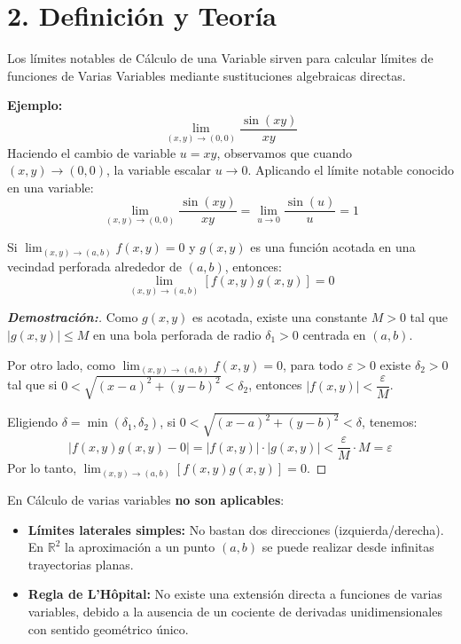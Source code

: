 \documentclass[11pt]{article}
\newenvironment{teoria}{%
  \section*{2. Definición y Teoría}%
}{}
\newenvironment{teorema}[1]{%
  \begin{tcolorbox}[colback=green!5,colframe=green!75!black,title=Teorema: #1]%
}{%
  \end{tcolorbox}%
}
\newenvironment{alerta}[1]{%
  \begin{tcolorbox}[colback=yellow!10,colframe=orange!80!black,title=Alerta: #1]%
}{%
  \end{tcolorbox}%
}
\newenvironment{procesamiento}[1]{%
  \begin{tcolorbox}[colback=gray!5,colframe=gray!60!black,title=Procedimiento: #1]%
}{%
  \end{tcolorbox}%
}
\begin{document}
\begin{teoria}
  \begin{procesamiento}{Límites Notables}
    Los límites notables de Cálculo de una Variable sirven para calcular límites de funciones de Varias Variables mediante sustituciones algebraicas directas.
    
    \textbf{Ejemplo:}
    $$ \lim_{(x,y) \to (0,0)} \dfrac{\sin(xy)}{xy} $$
    Haciendo el cambio de variable $u = xy$, observamos que cuando $(x,y) \to (0,0)$, la variable escalar $u \to 0$. Aplicando el límite notable conocido en una variable:
    $$ \lim_{(x,y) \to (0,0)} \dfrac{\sin(xy)}{xy} = \lim_{u \to 0} \dfrac{\sin(u)}{u} = 1 $$
  \end{procesamiento}

  \begin{teorema}{Teorema de Cero por Acotado}
    Si $\displaystyle \lim_{(x,y) \to (a,b)} f(x,y) = 0$ y $g(x,y)$ es una función acotada en una vecindad perforada alrededor de $(a,b)$, entonces:
    $$ \lim_{(x,y) \to (a,b)} [f(x,y)g(x,y)] = 0 $$
  \end{teorema}

  \begin{proof}[\textbf{Demostración:}]
    Como $g(x,y)$ es acotada, existe una constante $M > 0$ tal que $|g(x,y)| \leq M$ en una bola perforada de radio $\delta_1 > 0$ centrada en $(a,b)$.
    
    Por otro lado, como $\displaystyle \lim_{(x,y) \to (a,b)} f(x,y) = 0$, para todo $\varepsilon > 0$ existe $\delta_2 > 0$ tal que si $0 < \sqrt{(x-a)^2 + (y-b)^2} < \delta_2$, entonces $|f(x,y)| < \dfrac{\varepsilon}{M}$.
    
    Eligiendo $\delta = \min(\delta_1, \delta_2)$, si $0 < \sqrt{(x-a)^2 + (y-b)^2} < \delta$, tenemos:
    $$ |f(x,y)g(x,y) - 0| = |f(x,y)| \cdot |g(x,y)| < \dfrac{\varepsilon}{M} \cdot M = \varepsilon $$
    Por lo tanto, $\displaystyle \lim_{(x,y) \to (a,b)} [f(x,y)g(x,y)] = 0$.
  \end{proof}

  \begin{alerta}{Propiedades que dejan de ser válidas}
    En Cálculo de varias variables \textbf{no son aplicables}:
    \begin{itemize}
      \item \textbf{Límites laterales simples:} No bastan dos direcciones (izquierda/derecha). En $\mathbb{R}^2$ la aproximación a un punto $(a,b)$ se puede realizar desde infinitas trayectorias planas.
      \item \textbf{Regla de L'Hôpital:} No existe una extensión directa a funciones de varias variables, debido a la ausencia de un cociente de derivadas unidimensionales con sentido geométrico único.
    \end{itemize}
  \end{alerta}

\end{teoria}
\end{document}
